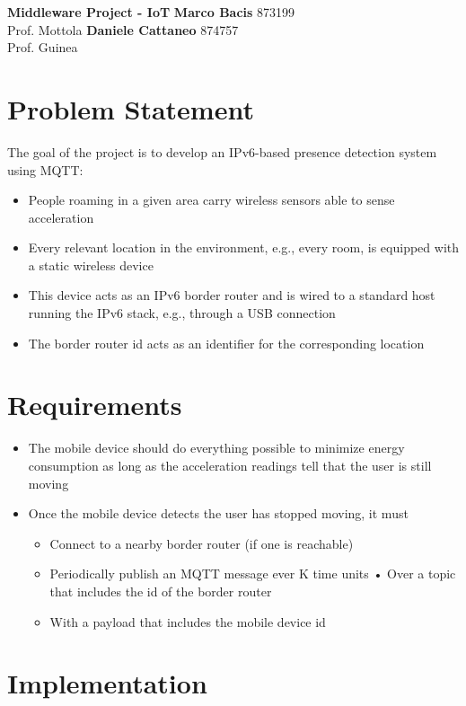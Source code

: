 \documentclass[a4paper, 11pt]{article}
\begin{document}
\noindent
\large\textbf{Middleware Project - IoT} \hfill \textbf{Marco Bacis} 873199 \\
Prof. Mottola \hfill \textbf{Daniele Cattaneo} 874757 \\
Prof. Guinea
\section*{Problem Statement}

The goal of the project is to develop an IPv6-based presence detection system using MQTT:
\begin{itemize}
\item People roaming in a given area carry wireless sensors able to sense acceleration
\item Every relevant location in the environment, e.g., every room, is equipped with a static wireless device
\item This device acts as an IPv6 border router and is wired to a standard host running the IPv6 stack, e.g., through a USB connection
\item The border router id acts as an identifier for the corresponding location
\end{itemize}

\section*{Requirements}

\begin{itemize}
\item The mobile device should do everything possible to minimize energy consumption as long as the acceleration readings tell that the user is still moving
\item Once the mobile device detects the user has stopped moving, it must
\begin{itemize}
    \item Connect to a nearby border router (if one is reachable)
    \item Periodically publish an MQTT message ever K time units • Over a topic that includes the id of the border router
    \item With a payload that includes the mobile device id
\end{itemize}

\end{itemize}

\section*{Implementation}
\lipsum[2]
\end{document}
